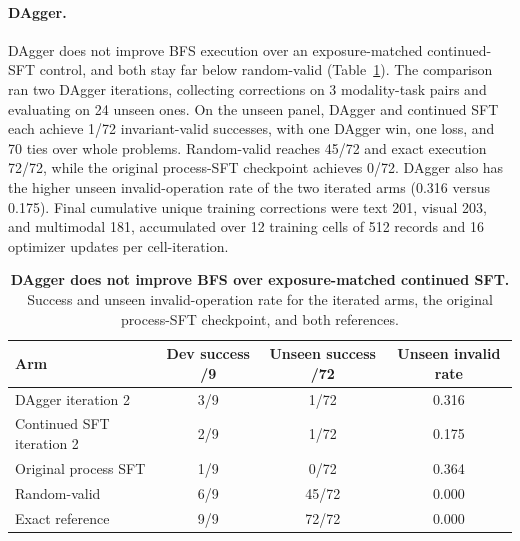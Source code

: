 \paragraph{DAgger.} DAgger \citep{ross2011dagger} does not improve BFS execution over an exposure-matched continued-SFT control, and both stay far below random-valid (Table~\ref{tab:results-dagger}). The comparison ran two DAgger iterations, collecting corrections on 3 modality-task pairs and evaluating on 24 unseen ones. On the unseen panel, DAgger and continued SFT each achieve 1/72 invariant-valid successes, with one DAgger win, one loss, and 70 ties over whole problems. Random-valid reaches 45/72 and exact execution 72/72, while the original process-SFT checkpoint achieves 0/72. DAgger also has the higher unseen invalid-operation rate of the two iterated arms (0.316 versus 0.175). Final cumulative unique training corrections were text 201, visual 203, and multimodal 181, accumulated over 12 training cells of 512 records and 16 optimizer updates per cell-iteration.

\begin{table}[t]
\caption{\textbf{DAgger does not improve BFS over exposure-matched continued SFT.} Success and unseen invalid-operation rate for the iterated arms, the original process-SFT checkpoint, and both references.}
\label{tab:results-dagger}
\centering\footnotesize
\begin{tabular}{lccc}
\toprule[0.4mm]
\rowcolor{mygray}\textbf{Arm} & \textbf{Dev success /9} & \textbf{Unseen success /72} & \textbf{Unseen invalid rate} \\
\midrule
DAgger iteration 2 & 3/9 & 1/72 & 0.316 \\
Continued SFT iteration 2 & 2/9 & 1/72 & 0.175 \\
Original process SFT & 1/9 & 0/72 & 0.364 \\
\midrule
Random-valid & 6/9 & 45/72 & 0.000 \\
Exact reference & 9/9 & 72/72 & 0.000 \\
\bottomrule
\end{tabular}
\end{table}

